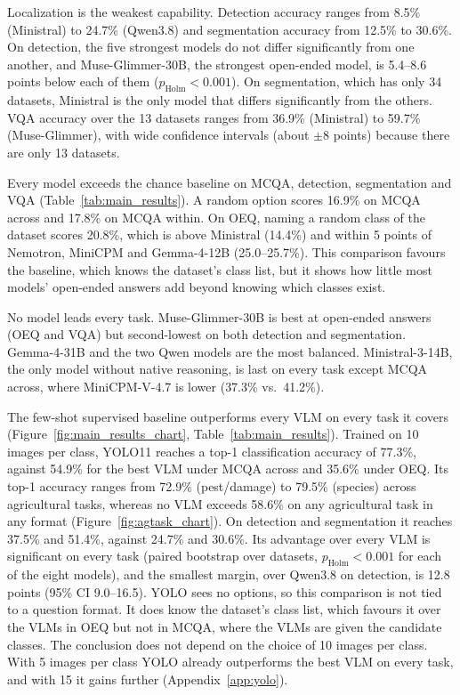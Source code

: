 \documentclass[10pt,letterpaper]{article}
\begin{document}
Localization is the weakest capability. Detection accuracy ranges from 8.5\% (Ministral) to 24.7\% (Qwen3.8) and segmentation accuracy from 12.5\% to 30.6\%. On detection, the five strongest models do not differ significantly from one another, and Muse-Glimmer-30B, the strongest open-ended model, is 5.4--8.6 points below each of them ($p_{\text{Holm}} < 0.001$). On segmentation, which has only 34 datasets, Ministral is the only model that differs significantly from the others. VQA accuracy over the 13 datasets ranges from 36.9\% (Ministral) to 59.7\% (Muse-Glimmer), with wide confidence intervals (about $\pm$8 points) because there are only 13 datasets.

Every model exceeds the chance baseline on MCQA, detection, segmentation and VQA (Table~\ref{tab:main_results}). A random option scores 16.9\% on MCQA across and 17.8\% on MCQA within. On OEQ, naming a random class of the dataset scores 20.8\%, which is above Ministral (14.4\%) and within 5 points of Nemotron, MiniCPM and Gemma-4-12B (25.0--25.7\%). This comparison favours the baseline, which knows the dataset's class list, but it shows how little most models' open-ended answers add beyond knowing which classes exist.

No model leads every task. Muse-Glimmer-30B is best at open-ended answers (OEQ and VQA) but second-lowest on both detection and segmentation. Gemma-4-31B and the two Qwen models are the most balanced. Ministral-3-14B, the only model without native reasoning, is last on every task except MCQA across, where MiniCPM-V-4.7 is lower (37.3\% vs.\ 41.2\%).

The few-shot supervised baseline outperforms every VLM on every task it covers (Figure~\ref{fig:main_results_chart}, Table~\ref{tab:main_results}). Trained on 10 images per class, YOLO11 reaches a top-1 classification accuracy of 77.3\%, against 54.9\% for the best VLM under MCQA across and 35.6\% under OEQ. Its top-1 accuracy ranges from 72.9\% (pest/damage) to 79.5\% (species) across agricultural tasks, whereas no VLM exceeds 58.6\% on any agricultural task in any format (Figure~\ref{fig:agtask_chart}). On detection and segmentation it reaches 37.5\% and 51.4\%, against 24.7\% and 30.6\%. Its advantage over every VLM is significant on every task (paired bootstrap over datasets, $p_{\text{Holm}} < 0.001$ for each of the eight models), and the smallest margin, over Qwen3.8 on detection, is 12.8 points (95\% CI 9.0--16.5). YOLO sees no options, so this comparison is not tied to a question format. It does know the dataset's class list, which favours it over the VLMs in OEQ but not in MCQA, where the VLMs are given the candidate classes. The conclusion does not depend on the choice of 10 images per class. With 5 images per class YOLO already outperforms the best VLM on every task, and with 15 it gains further (Appendix~\ref{app:yolo}).
\end{document}
